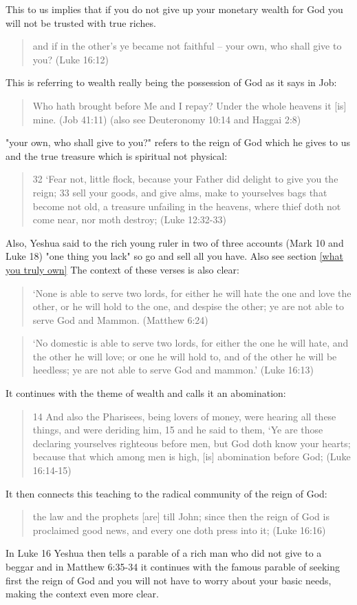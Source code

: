 \documentclass[11pt]{article}
\begin{document}
This to us implies that if you do not give up your monetary wealth for God you will not be trusted with true riches. 
\begin{quote}
and if in the other's ye became not faithful -- your own, who shall give to you? (Luke 16:12) 
\end{quote}
This is referring to wealth really being the possession of God as it says in Job: 
\begin{quote}
Who hath brought before Me and I repay? Under the whole heavens it [is] mine. (Job 41:11) (also see Deuteronomy 10:14 and Haggai 2:8)
\end{quote}  
"your own, who shall give to you?" refers to the reign of God which he gives to us and the true treasure which is spiritual not physical: 
\begin{quote}
32 `Fear not, little flock, because your Father did delight to give you the reign; 33 sell your goods, and give alms, make to yourselves bags that become not old, a treasure unfailing in the heavens, where thief doth not come near, nor moth destroy; (Luke 12:32-33) 
\end{quote} Also, Yeshua said to the rich young ruler in two of three accounts (Mark 10 and Luke 18) "one thing you lack" so go and sell all you have. Also see section \ref{what you truly own} The context of these verses is also clear:
\begin{quote}
`None is able to serve two lords, for either he will hate the one and love the other, or he will hold to the one, and despise the other; ye are not able to serve God and Mammon. (Matthew 6:24)
\end{quote}
\begin{quote}
`No domestic is able to serve two lords, for either the one he will hate, and the other he will love; or one he will hold to, and of the other he will be heedless; ye are not able to serve God and mammon.' (Luke 16:13)
\end{quote}
It continues with the theme of wealth and calls it an abomination:
\begin{quote}
14 And also the Pharisees, being lovers of money, were hearing all these things, and were deriding him, 15 and he said to them, `Ye are those declaring yourselves righteous before men, but God doth know your hearts; because that which among men is high, [is] abomination before God; (Luke 16:14-15)
\end{quote}
It then connects this teaching to the radical community of the reign of God:
\begin{quote}
the law and the prophets [are] till John; since then the reign of God is proclaimed good news, and every one doth press into it; (Luke 16:16)
\end{quote}
In Luke 16 Yeshua then tells a parable of a rich man who did not give to a beggar and in Matthew 6:35-34 it continues with the famous parable of seeking first the reign of God and you will not have to worry about your basic needs, making the context even more clear. 
\end{document}
